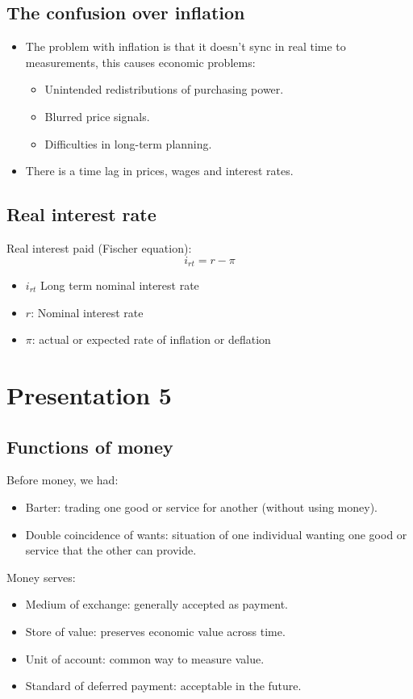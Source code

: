 \documentclass[openany]{book}
\begin{document}
\section{The confusion over inflation}
\begin{itemize}
    \item The problem with inflation is that it doesn't sync in real time to measurements, this causes economic problems:
    \begin{itemize}
            \item Unintended redistributions of purchasing power.
            \item Blurred price signals. 
            \item Difficulties in long-term planning.  
        \end{itemize}    
    \item There is a time lag in prices, wages and interest rates. 
\end{itemize}


\section{Real interest rate}
Real interest paid (Fischer equation): 
\[
  i_{rt} = r - \pi  
\]
\begin{itemize}
    \item $i_{rt}$ Long term nominal interest rate 
    \item $r$: Nominal interest rate 
    \item $\pi$: actual or expected rate of inflation or deflation
\end{itemize}


\chapter{Presentation 5}
\section{Functions of money}
Before money, we had: 
\begin{itemize}
    \item Barter: trading one good or service for another (without using money).
    \item Double coincidence of wants: situation of one individual wanting one good or service that the other can provide. 
\end{itemize}
Money serves: 
\begin{itemize}
    \item Medium of exchange: generally accepted as payment.
    \item Store of value: preserves economic value across time.
    \item Unit of account: common way to measure value. 
    \item Standard of deferred payment: acceptable in the future.
\end{itemize}
\end{document}
